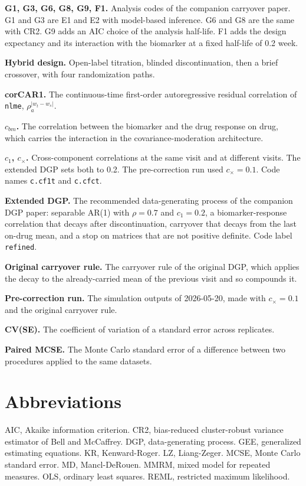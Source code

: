 \documentclass[
  11pt,
]{article}
\begin{document}
\textbf{G1, G3, G6, G8, G9, F1.} Analysis codes of the companion carryover
paper. G1 and G3 are E1 and E2 with model-based inference. G6 and G8
are the same with CR2. G9 adds an AIC choice of the analysis
half-life. F1 adds the design expectancy and its interaction with the
biomarker at a fixed half-life of 0.2 week.

\textbf{Hybrid design.} Open-label titration, blinded discontinuation,
then a brief crossover, with four randomization paths.

\textbf{corCAR1.} The continuous-time first-order autoregressive residual
correlation of \texttt{nlme}, \(\rho_a^{|w_t - w_s|}\).

\textbf{\(c_{bm}\).} The correlation between the biomarker and the drug
response on drug, which carries the interaction in the
covariance-moderation architecture.

\textbf{\(c_1\), \(c_\times\).} Cross-component correlations at the same visit
and at different visits. The extended DGP sets both to 0.2. The
pre-correction run used \(c_\times = 0.1\). Code names \texttt{c.cf1t} and
\texttt{c.cfct}.

\textbf{Extended DGP.} The recommended data-generating process of the
companion DGP paper: separable AR(1) with \(\rho = 0.7\) and
\(c_1 = 0.2\), a biomarker-response correlation that decays after
discontinuation, carryover that decays from the last on-drug mean,
and a stop on matrices that are not positive definite. Code label
\texttt{refined}.

\textbf{Original carryover rule.} The carryover rule of the original DGP,
which applies the decay to the already-carried mean of the previous
visit and so compounds it.

\textbf{Pre-correction run.} The simulation outputs of 2026-05-20, made
with \(c_\times = 0.1\) and the original carryover rule.

\textbf{CV(SE).} The coefficient of variation of a standard error across
replicates.

\textbf{Paired MCSE.} The Monte Carlo standard error of a difference
between two procedures applied to the same datasets.

\section*{Abbreviations}\label{abbreviations}

AIC, Akaike information criterion. CR2, bias-reduced cluster-robust
variance estimator of Bell and McCaffrey. DGP, data-generating
process. GEE, generalized estimating equations. KR, Kenward-Roger.
LZ, Liang-Zeger. MCSE, Monte Carlo standard error. MD, Mancl-DeRouen.
MMRM, mixed model for repeated measures. OLS, ordinary least squares.
REML, restricted maximum likelihood.
\end{document}
